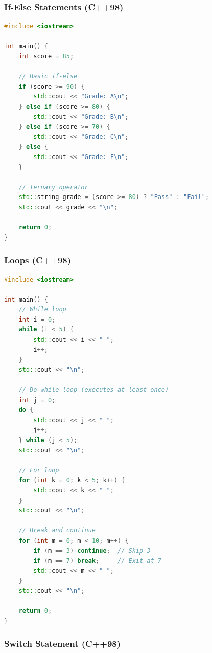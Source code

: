 \hypertarget{if-else-statements-c98}{%
\subsubsection{If-Else Statements
(C++98)}\label{if-else-statements-c98}}

\begin{lstlisting}[language={C++}]
#include <iostream>

int main() {
    int score = 85;

    // Basic if-else
    if (score >= 90) {
        std::cout << "Grade: A\n";
    } else if (score >= 80) {
        std::cout << "Grade: B\n";
    } else if (score >= 70) {
        std::cout << "Grade: C\n";
    } else {
        std::cout << "Grade: F\n";
    }

    // Ternary operator
    std::string grade = (score >= 80) ? "Pass" : "Fail";
    std::cout << grade << "\n";

    return 0;
}
\end{lstlisting}

\hypertarget{loops-c98}{%
\subsubsection{Loops (C++98)}\label{loops-c98}}

\begin{lstlisting}[language={C++}]
#include <iostream>

int main() {
    // While loop
    int i = 0;
    while (i < 5) {
        std::cout << i << " ";
        i++;
    }
    std::cout << "\n";

    // Do-while loop (executes at least once)
    int j = 0;
    do {
        std::cout << j << " ";
        j++;
    } while (j < 5);
    std::cout << "\n";

    // For loop
    for (int k = 0; k < 5; k++) {
        std::cout << k << " ";
    }
    std::cout << "\n";

    // Break and continue
    for (int m = 0; m < 10; m++) {
        if (m == 3) continue;  // Skip 3
        if (m == 7) break;     // Exit at 7
        std::cout << m << " ";
    }
    std::cout << "\n";

    return 0;
}
\end{lstlisting}

\hypertarget{switch-statement-c98}{%
\subsubsection{Switch Statement (C++98)}\label{switch-statement-c98}}

